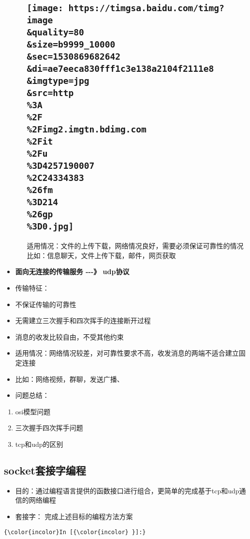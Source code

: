 \documentclass[11pt]{article}
\makeatletter
\def\maxwidth{\ifdim\Gin@nat@width>\linewidth\linewidth
    \else\Gin@nat@width\fi}
\let\Oldincludegraphics\includegraphics
\renewcommand{\includegraphics}[1]{\Oldincludegraphics[width=.8\maxwidth]{#1}}
\providecommand{\tightlist}{%
      \setlength{\itemsep}{0pt}\setlength{\parskip}{0pt}}
\makeatother
\begin{document}
\begin{itemize}
\begin{enumerate}
    \subsection{\texorpdfstring{\protect\texttt{[image: https://timgsa.baidu.com/timg?image\\\&quality=80\\\&size=b9999\_10000\\\&sec=1530869682642\\\&di=ae7eeca830fff1c3e138a2104f2111e8\\\&imgtype=jpg\\\&src=http\\\%3A\\\%2F\\\%2Fimg2.imgtn.bdimg.com\\\%2Fit\\\%2Fu\\\%3D4257190007\\\%2C24334383\\\%26fm\\\%3D214\\\%26gp\\\%3D0.jpg]}}{四次挥手}}\label{ux56dbux6b21ux6325ux624b}

    适用情况：文件的上传下载，网络情况良好，需要必须保证可靠性的情况
    比如：信息聊天，文件上传下载，邮件，网页获取
  \end{enumerate}
\item
  \textbf{面向无连接的传输服务 -\/-\/-》 udp协议}
\item
  传输特征：
\item
  不保证传输的可靠性
\item
  无需建立三次握手和四次挥手的连接断开过程
\item
  消息的收发比较自由，不受其他约束
\item
  适用情况：网络情况较差，对可靠性要求不高，收发消息的两端不适合建立固定连接
\item
  比如：网络视频，群聊，发送广播、
\item
  问题总结：
\end{itemize}

\begin{enumerate}
\def\labelenumi{\arabic{enumi}.}
\tightlist
\item
  osi模型问题
\item
  三次握手四次挥手问题
\item
  tcp和udp的区别
\end{enumerate}

\subsection{socket套接字编程}\label{socketux5957ux63a5ux5b57ux7f16ux7a0b}

\begin{itemize}
\tightlist
\item
  目的：通过编程语言提供的函数接口进行组合，更简单的完成基于tcp和udp通信的网络编程
\item
  套接字： 完成上述目标的编程方法方案
\end{itemize}

    \begin{Verbatim}[commandchars=\\\{\}]
{\color{incolor}In [{\color{incolor} }]:} 
\end{Verbatim}



    
    
    
    
\end{document}
